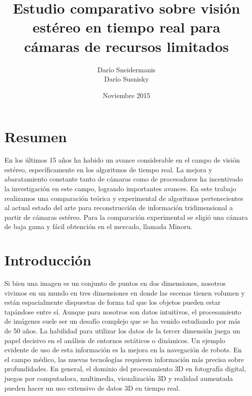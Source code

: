 \documentclass[11pt,a4paper,titlepage]{article}
\title{Estudio comparativo sobre visión estéreo en tiempo real para cámaras de recursos limitados}
\author{Darío Sneidermanis \\ Darío Susnisky}
\date{Noviembre 2015}
\begin{document}
\maketitle
\tableofcontents
\clearpage

\setlength{\parskip}{\baselineskip}

\section{Resumen}

En los últimos 15 años ha habido un avance considerable en el campo de visión estéreo, específicamente en los algoritmos de tiempo real. La mejora y abaratamiento constante tanto de cámaras como de procesadores ha incentivado la investigación en este campo, logrando importantes avances. En este trabajo realizamos una comparación teórica y experimental de algoritmos pertenecientes al actual estado del arte para reconstrucción de información tridimensional a partir de cámaras estéreo. Para la comparación experimental se eligió una cámara de baja gama y fácil obtención en el mercado, llamada Minoru.

\newpage

\section{Introducción}

Si bien una imagen es un conjunto de puntos en dos dimensiones, nosotros vivimos en un mundo en tres dimensiones en donde las escenas tienen volumen y están espacialmente dispuestas de forma tal que los objetos pueden estar tapándose entre sí. Aunque para nosotros son datos intuitivos, el procesamiento de imágenes suele ser un desafío complejo que se ha venido estudiando por más de 50 años. La habilidad para utilizar los datos de la tercer dimensión juega un papel decisivo en el análisis de entornos estáticos o dinámicos. Un ejemplo evidente de uso de esta información es la mejora en la navegación de robots. En el campo médico, las nuevas tecnologías requieren información más precisa sobre profundidades. En general, el dominio del procesamiento 3D en fotografía digital, juegos por computadora, multimedia, visualización 3D y realidad aumentada pueden hacer un uso extensivo de datos 3D en tiempo real.
\end{document}
